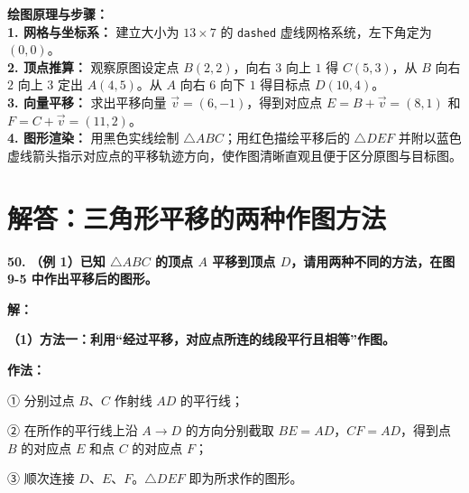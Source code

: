 \vspace{0.4cm}
{\small\color{blue!70!black}
\textbf{绘图原理与步骤：}\\
\textbf{1. 网格与坐标系：} 建立大小为 $13 \times 7$ 的 \texttt{dashed} 虚线网格系统，左下角定为 $(0,0)$。\\
\textbf{2. 顶点推算：} 观察原图设定点 $B(2,2)$，向右 $3$ 向上 $1$ 得 $C(5,3)$，从 $B$ 向右 $2$ 向上 $3$ 定出 $A(4,5)$。从 $A$ 向右 $6$ 向下 $1$ 得目标点 $D(10,4)$。\\
\textbf{3. 向量平移：} 求出平移向量 $\vec{v} = (6, -1)$，得到对应点 $E = B + \vec{v} = (8,1)$ 和 $F = C + \vec{v} = (11,2)$。\\
\textbf{4. 图形渲染：} 用黑色实线绘制 $\triangle ABC$；用红色描绘平移后的 $\triangle DEF$ 并附以蓝色虚线箭头指示对应点的平移轨迹方向，使作图清晰直观且便于区分原图与目标图。
}

\newpage



\newpage

\section{解答：三角形平移的两种作图方法}

\vspace{0.6cm}

\textbf{\LARGE 50.} \textbf{（例 1）已知 $\triangle ABC$ 的顶点 $A$ 平移到顶点 $D$，请用两种不同的方法，在图 9-5 中作出平移后的图形。}

\vspace{0.4cm}
\textbf{解：}

\textbf{（1）方法一：利用“经过平移，对应点所连的线段平行且相等”作图。}

\textbf{作法：}

① 分别过点 $B$、$C$ 作射线 $AD$ 的平行线；

② 在所作的平行线上沿 $A \to D$ 的方向分别截取 $BE = AD$，$CF = AD$，得到点 $B$ 的对应点 $E$ 和点 $C$ 的对应点 $F$；

③ 顺次连接 $D$、$E$、$F$。$\triangle DEF$ 即为所求作的图形。

